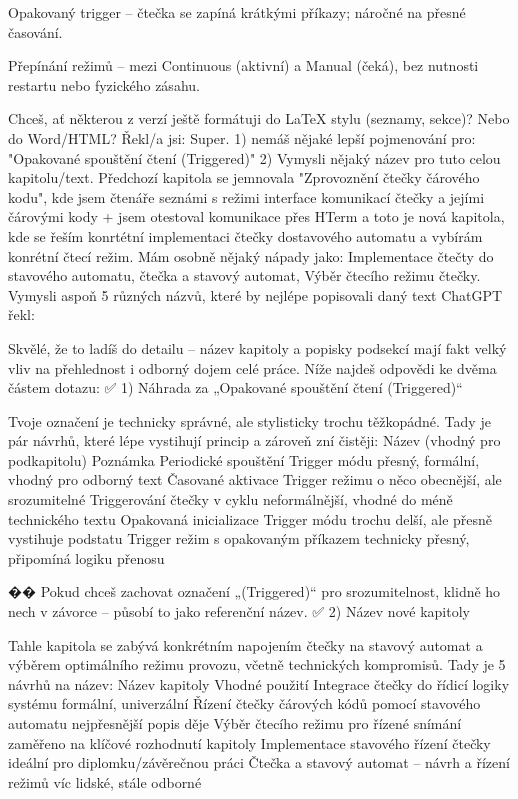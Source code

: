         Opakovaný trigger – čtečka se zapíná krátkými příkazy; náročné na přesné časování.

        Přepínání režimů – mezi Continuous (aktivní) a Manual (čeká), bez nutnosti restartu nebo fyzického zásahu.

Chceš, ať některou z verzí ještě formátuji do LaTeX stylu (seznamy, sekce)? Nebo do Word/HTML?
Řekl/a jsi:
Super.
1) nemáš nějaké lepší pojmenování pro: "Opakované spouštění čtení (Triggered)"
2) Vymysli nějaký název pro tuto celou kapitolu/text. Předchozí kapitola se jemnovala "Zprovoznění čtečky čárového kodu", kde jsem čtenáře seznámi s režimi interface komunikací čtečky a jejími čárovými kody + jsem otestoval komunikace přes HTerm a toto je nová kapitola, kde se řeším konrtétní implementaci čtečky dostavového automatu a vybírám konrétní čtecí režim. Mám osobně nějaký nápady jako: Implementace čtečty do stavového automatu, čtečka a stavový automat, Výběr čtecího režimu čtečky. Vymysli aspoň 5 různých názvů, které by nejlépe popisovali daný text
ChatGPT řekl:

Skvělé, že to ladíš do detailu – název kapitoly a popisky podsekcí mají fakt velký vliv na přehlednost i odborný dojem celé práce. Níže najdeš odpovědi ke dvěma částem dotazu:
✅ 1) Náhrada za „Opakované spouštění čtení (Triggered)“

Tvoje označení je technicky správné, ale stylisticky trochu těžkopádné. Tady je pár návrhů, které lépe vystihují princip a zároveň zní čistěji:
Název (vhodný pro podkapitolu)	Poznámka
Periodické spouštění Trigger módu	přesný, formální, vhodný pro odborný text
Časované aktivace Trigger režimu	o něco obecnější, ale srozumitelné
Triggerování čtečky v cyklu	neformálnější, vhodné do méně technického textu
Opakovaná inicializace Trigger módu	trochu delší, ale přesně vystihuje podstatu
Trigger režim s opakovaným příkazem	technicky přesný, připomíná logiku přenosu

�� Pokud chceš zachovat označení „(Triggered)“ pro srozumitelnost, klidně ho nech v závorce – působí to jako referenční název.
✅ 2) Název nové kapitoly

Tahle kapitola se zabývá konkrétním napojením čtečky na stavový automat a výběrem optimálního režimu provozu, včetně technických kompromisů. Tady je 5 návrhů na název:
Název kapitoly	Vhodné použití
Integrace čtečky do řídicí logiky systému	formální, univerzální
Řízení čtečky čárových kódů pomocí stavového automatu	nejpřesnější popis děje
Výběr čtecího režimu pro řízené snímání	zaměřeno na klíčové rozhodnutí kapitoly
Implementace stavového řízení čtečky	ideální pro diplomku/závěrečnou práci
Čtečka a stavový automat – návrh a řízení režimů	víc lidské, stále odborné

